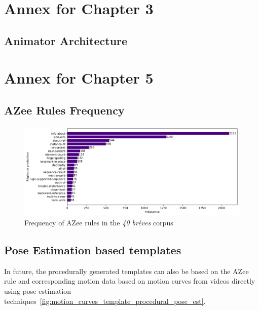 \documentclass[../main.tex]{subfiles}
\begin{document}
\section{Annex for Chapter 3}
\label{annex:avatar_creation_pose_synthesis}

\subsection{Animator Architecture}
\label{annex:avatar_creation_pose_synthesis:animator_architecture}



\section{Annex for Chapter 5}
\label{annex:intermediate_blocks_pose_correction}

\subsection{AZee Rules Frequency}
\label{annex:intermediate_blocks_pose_correction:azee_rules_frequency}

\begin{figure}[h]
    \centering
    \includegraphics[width=5in]{chapters/intermediate_blocks_pose_correction/images/azee_rule_frequency.png}
    \caption{Frequency of AZee rules in the \emph{40 brèves} corpus}
    \label{fig:azee_rule_frequency_ch1}
\end{figure}

\subsection{Pose Estimation based templates}
\label{annex:intermediate_blocks_pose_correction:pose_est_templates}

In future, the procedurally generated templates can also be based on the AZee rule and corresponding motion data based on motion curves from videos directly using pose estimation techniques~\ref{fig:motion_curves_template_procedural_pose_est}.
\end{document}
